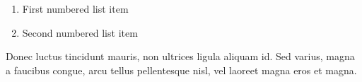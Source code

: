 \documentclass[a4paper, 11pt]{article} %
\begin{document}
\begin{enumerate}
\item First numbered list item
\item Second numbered list item
\end{enumerate}

Donec luctus tincidunt mauris, non ultrices ligula aliquam id. 
Sed varius, magna a faucibus congue, arcu tellus pellentesque nisl, vel laoreet magna eros et magna. 






\end{document}
